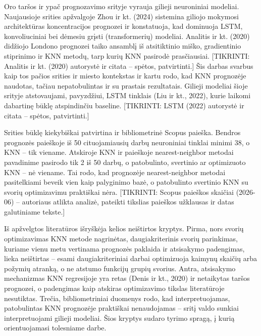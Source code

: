 \documentclass[]{VUMIFTemplateClass}
\begin{document}
    Oro taršos ir ypač  prognozavimo srityje vyrauja gilieji neuroniniai modeliai. Naujausioje srities apžvalgoje Zhou ir kt. (2024) sistemina giliojo mokymosi architektūras  koncentracijos prognozei ir konstatuoja, kad dominuoja LSTM, konvoliuciniai bei dėmesiu grįsti (transformerių) modeliai. Analitis ir kt. (2020) didžiojo Londono  prognozei taiko ansamblį iš atsitiktinio miško, gradientinio stiprinimo ir KNN metodų, tarp kurių KNN pasirodė prasčiausiai. [TIKRINTI: Analitis ir kt. (2020) autorystė ir citata -- spėtos, patvirtinti.] Šis darbas svarbus kaip tos pačios srities ir miesto kontekstas ir kartu rodo, kad KNN  prognozėje naudotas, tačiau nepatobulintas ir su prastais rezultatais. Gilieji modeliai šioje srityje atstovaujami, pavyzdžiui, LSTM tinklais (Liu ir kt., 2022), kurie laikomi dabartinę būklę atspindinčiu baseline. [TIKRINTI: LSTM  (2022) autorystė ir citata -- spėtos, patvirtinti.]

    Srities būklę kiekybiškai patvirtina ir bibliometrinė Scopus paieška. Bendros  prognozės paieškoje iš 50 cituojamiausių darbų neuroniniai tinklai minimi 38, o KNN -- tik viename. Atskiroje KNN ir  paieškoje nearest-neighbor metodai pavadinime pasirodo tik 2 iš 50 darbų, o patobulinto, svertinio ar optimizuoto KNN -- nė viename. Tai rodo, kad  prognozėje nearest-neighbor metodai pasitelkiami beveik vien kaip palyginimo bazė, o patobulinto svertinio KNN su svorių optimizavimu praktiškai nėra. [TIKRINTI: Scopus paieškos skaičiai (2026-06) -- autoriaus atlikta analizė, pateikti tikslias paieškos užklausas ir datas galutiniame tekste.]

    Iš apžvelgtos literatūros išryškėja kelios neištirtos kryptys. Pirma, nors svorių optimizavimas KNN metode nagrinėtas, daugiakriterinis svorių parinkimas, kuriame vienu metu vertinama prognozės paklaida ir atsisakymo padengimas, lieka neištirtas -- esami daugiakriteriniai darbai optimizuoja kaimynų skaičių arba požymių atranką, o ne atstumo funkcijų grupių svorius. Antra, atsisakymo mechanizmas KNN regresijoje yra retas (Denis ir kt., 2020) ir netaikytas taršos prognozei, o padengimas kaip atskiras optimizavimo tikslas literatūroje nesutiktas. Trečia, bibliometriniai duomenys rodo, kad interpretuojamas, patobulintas KNN  prognozėje praktiškai nenaudojamas -- sritį valdo sunkiai interpretuojami gilieji modeliai. Šios kryptys sudaro tyrimo spragą, į kurią orientuojamasi tolesniame darbe. %
\end{document}
